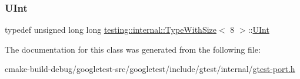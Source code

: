 \subsubsection{\texorpdfstring{UInt}{UInt}}
{\footnotesize\ttfamily typedef unsigned long long \mbox{\hyperlink{classtesting_1_1internal_1_1TypeWithSize}{testing\+::internal\+::\+Type\+With\+Size}}$<$ 8 $>$\+::\mbox{\hyperlink{classtesting_1_1internal_1_1TypeWithSize_3_018_01_4_a747e21c5aee8faf07ec65cd4c3d1ca62}{U\+Int}}}



The documentation for this class was generated from the following file\+:\begin{DoxyCompactItemize}
\item 
cmake-\/build-\/debug/googletest-\/src/googletest/include/gtest/internal/\mbox{\hyperlink{gtest-port_8h}{gtest-\/port.\+h}}\end{DoxyCompactItemize}
